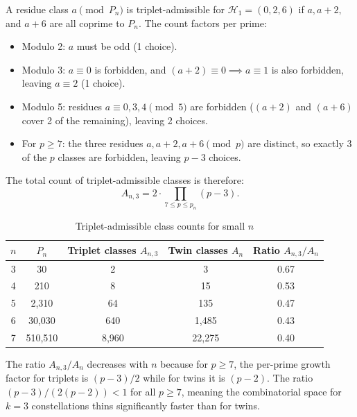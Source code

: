 \documentclass[11pt]{article}
\begin{document}
A residue class $a \pmod{P_n}$ is triplet-admissible for $\mathcal{H}_1 = (0, 2, 6)$ if $a, a+2,$ and $a+6$ are all coprime to $P_n$. The count factors per prime:
\begin{itemize}
  \item Modulo 2: $a$ must be odd (1 choice).
  \item Modulo 3: $a \equiv 0$ is forbidden, and $(a+2) \equiv 0 \implies a \equiv 1$ is also forbidden, leaving $a \equiv 2$ (1 choice).
  \item Modulo 5: residues $a \equiv 0, 3, 4 \pmod 5$ are forbidden ($(a+2)$ and $(a+6)$ cover 2 of the remaining), leaving 2 choices.
  \item For $p \geq 7$: the three residues $a, a+2, a+6 \pmod p$ are distinct, so exactly 3 of the $p$ classes are forbidden, leaving $p-3$ choices.
\end{itemize}
The total count of triplet-admissible classes is therefore:
\begin{equation}
    A_{n,3} = 2 \cdot \prod_{7 \le p \le p_n} (p-3).
\end{equation}

\begin{table}[h]
\centering
\caption{Triplet-admissible class counts for small $n$}
\label{tab:triplet_counts}
\begin{tabular}{ccccc}
\toprule
$n$ & $P_n$ & Triplet classes $A_{n,3}$ & Twin classes $A_n$ & Ratio $A_{n,3}/A_n$ \\
\midrule
3 & 30 & 2 & 3 & 0.67 \\
4 & 210 & 8 & 15 & 0.53 \\
5 & 2{,}310 & 64 & 135 & 0.47 \\
6 & 30{,}030 & 640 & 1{,}485 & 0.43 \\
7 & 510{,}510 & 8{,}960 & 22{,}275 & 0.40 \\
\bottomrule
\end{tabular}

\vspace{0.5em}
\end{table}

The ratio $A_{n,3}/A_n$ decreases with $n$ because for $p \geq 7$, the per-prime growth factor for triplets is $(p-3)/2$ while for twins it is $(p-2)$. The ratio $(p-3)/(2(p-2)) < 1$ for all $p \geq 7$, meaning the combinatorial space for $k=3$ constellations thins significantly faster than for twins.
\end{document}

